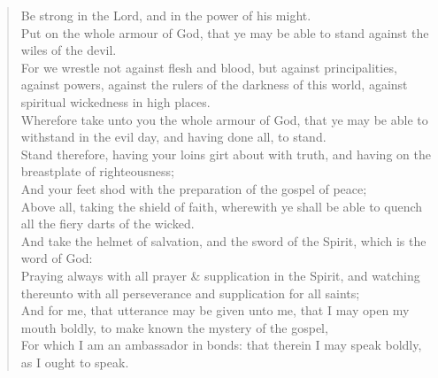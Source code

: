 \documentclass[MAIN]{subfiles}
\begin{document}
\begin{verse}
Be strong in the Lord, and in the power of his might.\\
Put on the whole armour of God, that ye may be able to stand against the wiles of the devil.\\
For we wrestle not against flesh and blood, but against principalities, against powers, against the rulers of the darkness of this world, against spiritual wickedness in high places.\\
Wherefore take unto you the whole armour of God, that ye may be able to withstand in the evil day, and having done all, to stand.\\
Stand therefore, having your loins girt about with truth, and having on the breastplate of righteousness;\\
And your feet shod with the preparation of the gospel of peace;\\
Above all, taking the shield of faith, wherewith ye shall be able to quench all the fiery darts of the wicked.\\
And take the helmet of salvation, and the sword of the Spirit, which is the word of God:\\
Praying always with all prayer \& supplication in the Spirit, and watching thereunto with all perseverance and supplication for all saints;\\
And for me, that utterance may be given unto me, that I may open my mouth boldly, to make known the mystery of the gospel,\\
For which I am an ambassador in bonds: that therein I may speak boldly, as I ought to speak.
\end{verse}
\end{document}
